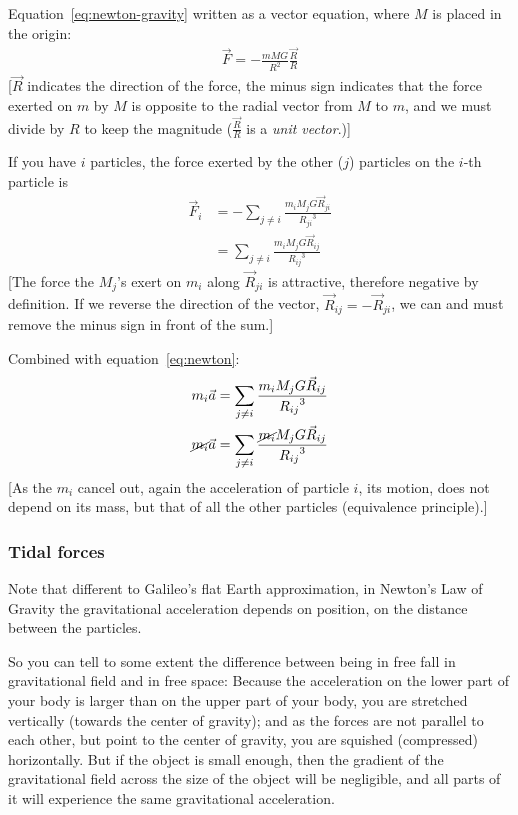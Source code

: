 \documentclass[pagesize,headsepline,10pt,parskip=half,BCOR=12mm]{scrreprt}
\begin{document}
        Equation~\ref{eq:newton-gravity} written as a vector
        equation, where $M$ is placed in the origin:
        \begin{align}\label{eq:newton-gravity-vector}
          \vec F = -\frac{mMG}{R^2} \frac{\vec R}{R}
        \end{align}
        [$\vec R$ indicates the direction of the force, the minus
        sign indicates that the force exerted on $m$ by $M$ is
        opposite to the radial vector from $M$ to $m$, and we must
        divide by $R$ to keep the magnitude ($\frac{\vec R}{R}$ is
        a \emph{unit vector}.)]

        If you have $i$ particles, the force exerted by the other
        ($j$) particles on the $i$-th particle is
        \begin{align}
          \vec F_i &= -\sum_{j \neq i}{\frac{m_i
          M_jG\vec R_{ji}}{{R_{ji}}^3}}\\
          &= \sum_{j \neq i}{\frac{m_i
          M_jG\vec R_{ij}}{{R_{ij}}^3}}
        \end{align}
        [The force the $M_j$'s exert on $m_i$ along $\vec R_{ji}$
        is attractive, therefore negative by definition. If we
        reverse the direction of the vector, $\vec R_{ij} = -\vec R_{ji}$, we can and must remove the minus sign in front of
        the sum.]

        Combined with equation~\ref{eq:newton}:
        \begin{align}\label{eq:newton-combined}
          m_i \vec a &= \sum_{j \neq i}{\frac{m_i
          M_jG\vec R_{ij}}{{R_{ij}}^3}} \\
          \cancel{m_i} \vec a &= \sum_{j \neq i}{\frac{\cancel{m_i}
          M_jG\vec R_{ij}}{{R_{ij}}^3}}
        \end{align}
        [As the $m_i$ cancel out, again the acceleration of
        particle $i$, its motion, does not depend on its mass, but
        that of all the other particles (equivalence principle).]

        \subsubsection{Tidal forces}
          Note that different to Galileo's flat Earth approximation,
          in Newton's Law of Gravity the gravitational acceleration
          depends on position, on the distance between the particles.

          So you can tell to some extent the difference between
          being in free fall in gravitational field and in free
          space:
          Because the acceleration on the lower part of your body
          is larger than on the upper part of your body, you are
          stretched vertically (towards the center of gravity); and
          as the forces are not parallel to each other, but point
          to the center of gravity, you are squished
          (compressed) horizontally.
          But if the object is small enough, then the gradient of
          the gravitational field across the size of the object
          will be negligible, and all parts of it will experience
          the same gravitational acceleration.
\end{document}
